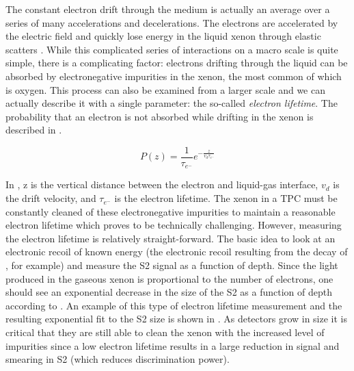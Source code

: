 The constant electron drift through the medium is actually an average over a series of many accelerations and decelerations.  The electrons are accelerated by the electric field and quickly lose energy in the liquid xenon through elastic scatters \cite{atrazhev2005electron}.  While this complicated series of interactions on a macro scale is quite simple, there is a complicating factor: electrons drifting through the liquid can be absorbed by electronegative impurities in the xenon, the most common of which is oxygen.  This process can also be examined from a larger scale and we can actually describe it with a single parameter: the so-called \textit{electron lifetime}.  The probability that an electron is not absorbed while drifting in the xenon is described in .

\begin{equation}
        \label{eqn:tpc_electron_lifetime}
        P(z) = \frac{1}{\tau_{e^-}} e^{-\frac{z}{v_d \tau_{e^-}}}
\end{equation}

In , z is the vertical distance between the electron and liquid-gas interface, $v_d$ is the drift velocity, and $\tau_{e^-}$ is the electron lifetime.  The xenon in a TPC must be constantly cleaned of these electronegative impurities to maintain a reasonable electron lifetime which proves to be technically challenging.  However, measuring the electron lifetime is relatively straight-forward.  The basic idea to look at an electronic recoil of known energy (the electronic recoil resulting from the decay of , for example) and measure the S2 signal as a function of depth.   Since the light produced in the gaseous xenon is proportional to the number of electrons, one should see an exponential decrease in the size of the S2 as a function of depth according to .  An example of this type of electron lifetime measurement and the resulting exponential fit to the S2 size is shown in .  As detectors grow in size it is critical that they are still able to clean the xenon with the increased level of impurities since a low electron lifetime results in a large reduction in signal and smearing in S2 (which reduces discrimination power).

